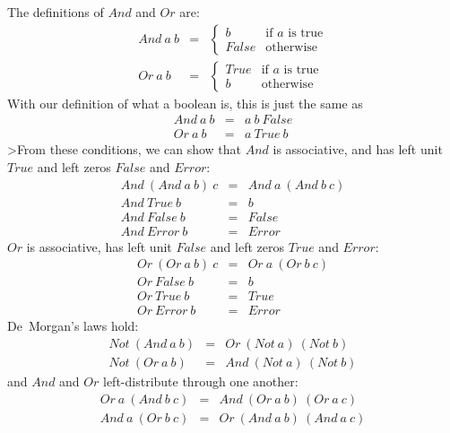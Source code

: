 The definitions of $And$ and $Or$ are:
\begin{eqnarray*}
   And~a~b  &  
   =  &  
   \left\{
      \begin{array}{ll}
         b      &  \mbox{if $a$ is true}  \\
         False  &  \mbox{otherwise}
      \end{array}
   \right.
   \\
   Or~a~b  &  
   =  &  
   \left\{
      \begin{array}{ll}
         True   &  \mbox{if $a$ is true}  \\
         b      &  \mbox{otherwise}
      \end{array}
   \right.
\end{eqnarray*}
With our definition of what a boolean is, this is just the same as
\begin{eqnarray*}
   And~a~b  &  =  &  a~b~False  \\
    Or~a~b  &  =  &  a~True~b
\end{eqnarray*}
>From these conditions, we can show that $And$ is associative, and 
has left unit $True$ and left zeros $False$ and $Error$:
\begin{eqnarray*}
   And~(And~a~b)~c  &  =  &  And~a~(And~b~c)  \\
        And~True~b  &  =  &  b  \\
       And~False~b  &  =  &  False  \\
       And~Error~b  &  =  &  Error
\end{eqnarray*}
$Or$ is associative, has left unit $False$ and left zeros $True$ and $Error$:
\begin{eqnarray*}
   Or~(Or~a~b)~c  &  =  &  Or~a~(Or~b~c)  \\
      Or~False~b  &  =  &  b  \\
       Or~True~b  &  =  &  True  \\
      Or~Error~b  &  =  &  Error
\end{eqnarray*}
De~Morgan's laws hold:
\begin{eqnarray*}
   Not~(And~a~b)  &  =  &  Or~(Not~a)~(Not~b)  \\
    Not~(Or~a~b)  &  =  &  And~(Not~a)~(Not~b)  
\end{eqnarray*}
and $And$ and $Or$ left-distribute through one another:
\begin{eqnarray*}
   Or~a~(And~b~c)  &  =  &  And~(Or~a~b)~(Or~a~c)  \\
   And~a~(Or~b~c)  &  =  &  Or~(And~a~b)~(And~a~c)
\end{eqnarray*}
